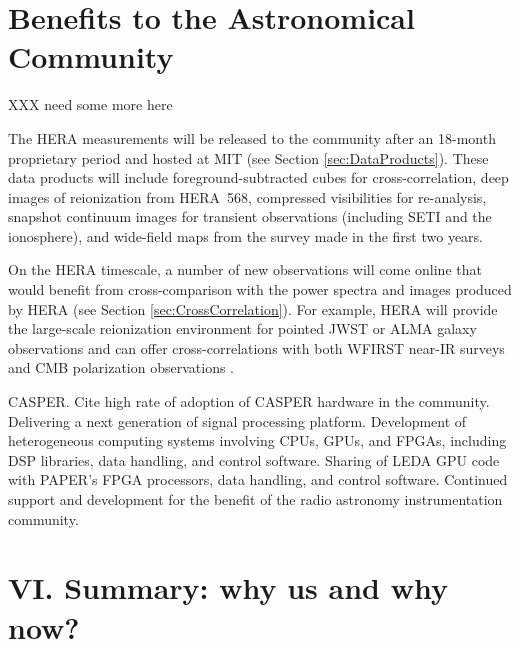 \documentclass[preprint]{aastex}
\begin{document}

\section{Benefits to the Astronomical Community}

XXX need some more here

The HERA measurements will be released to the community after an 18-month proprietary period and hosted at MIT (see Section \ref{sec:DataProducts}).  These data products will include foreground-subtracted cubes for
cross-correlation, deep images of reionization from HERA~568, compressed visibilities for re-analysis, snapshot continuum images for transient observations (including SETI and the ionosphere), and wide-field maps from the survey made in the first two years.

On the HERA timescale, a number of new observations will come online that would benefit from cross-comparison with the power spectra and images produced by HERA (see Section \ref{sec:CrossCorrelation}). For example, HERA will provide the large-scale reionization environment for pointed JWST or ALMA galaxy observations and can offer cross-correlations with both WFIRST near-IR surveys \citep{lidz_et_al2009} and CMB polarization observations \citep{tashiro_et_al2010}.
 
CASPER.
Cite high rate of adoption of CASPER hardware in the community.
Delivering a next generation of signal processing platform.
Development of heterogeneous computing systems involving CPUs, GPUs, and FPGAs, including DSP libraries, data handling, and control software.
Sharing of LEDA GPU code \citep{clarke_et_al2012} with PAPER's FPGA processors, data handling, and control software.
Continued support and development for the benefit of the radio astronomy instrumentation community.



\section{VI. Summary: why us and why now?} %
\end{document}
